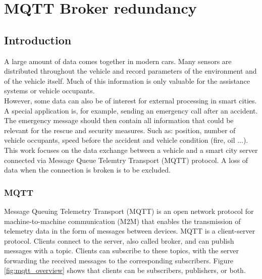 \chapter{MQTT Broker redundancy}
\label{intro} 



\section{Introduction}
\label{sec:1}
A large amount of data comes together in modern cars. Many sensors are distributed throughout the vehicle and record parameters of the environment and of the vehicle itself. Much of this information is only valuable for the assistance systems or vehicle occupants.\\


However, some data can also be of interest for external processing in smart cities. A special application is, for example, sending an emergency call after an accident. The emergency message should then contain all information that could be relevant for the rescue and security measures. Such as: position, number of vehicle occupants, speed before the accident and vehicle condition (fire, oil ...).\\


This work focuses on the data exchange between a vehicle and a smart city server connected via Message Queue Telemtry Transport (MQTT) protocol. A loss of data when the connection is broken is to be excluded.\\


\subsection{MQTT}
Message Queuing Telemetry Transport (MQTT) is an open network protocol for machine-to-machine communication (M2M) that enables the transmission of telemetry data in the form of messages between devices. MQTT is a client-server protocol. Clients connect to the server, also called broker, and can publish messages with a topic. Clients can subscribe to these topics, with the server forwarding the received messages to the corresponding subscribers. Figure \ref{fig:mqtt_overview} shows that clients can be subscribers, publishers, or both.\cite{mqtt_doc}\\

